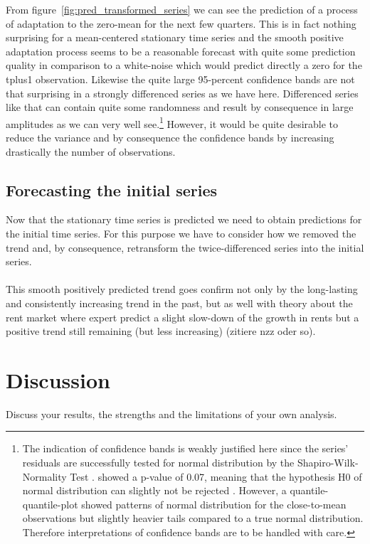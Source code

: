 \documentclass[11pt,a4paper]{article}
\begin{document}
From figure~\ref{fig:pred_transformed_series} we can see the prediction of a process of adaptation to the zero-mean for the next few quarters. This is in fact nothing surprising for a mean-centered stationary time series and the smooth positive adaptation process seems to be a reasonable forecast with quite some prediction quality in comparison to a white-noise which would predict directly a zero for the tplus1 observation. 
Likewise the quite large 95-percent confidence bands are not that surprising in a strongly differenced series as we have here. Differenced series like that can contain quite some randomness and result by consequence in large amplitudes as we can very well see.\footnote{The indication of confidence bands is weakly justified here since the series’ residuals are successfully tested for normal distribution by the Shapiro-Wilk-Normality Test . showed a p-value of 0.07, meaning that the hypothesis H0 of normal distribution can slightly not be rejected \citep{shapiro}. However, a quantile-quantile-plot showed patterns of normal distribution for the close-to-mean observations but slightly heavier tails compared to a true normal distribution. Therefore interpretations of confidence bands are to be handled with care.}
However, it would be quite desirable to reduce the variance and by consequence  the confidence bands by increasing drastically the number of observations.


\subsection{Forecasting the initial series}
Now that the stationary time series is predicted we need to obtain predictions for the initial time series. For this purpose we have to consider how we removed the trend and, by consequence, retransform the twice-differenced series into the initial series. 
\\
\\
This smooth positively predicted trend goes confirm not only by the long-lasting and consistently increasing trend in the past, but as well with theory about the rent market where expert predict a slight slow-down of the growth in rents but a positive trend still remaining (but less increasing) (zitiere nzz oder so).




\section{Discussion}
Discuss your results, the strengths and the limitations of your own analysis. 
\end{document}
